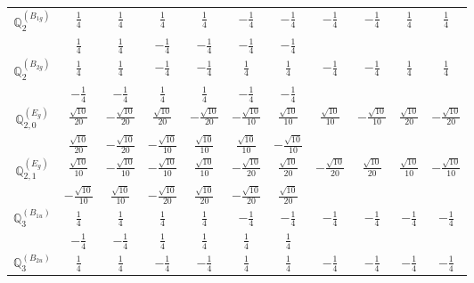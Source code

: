 \documentclass[fleqn,10pt,landscape]{article}
\begin{document}
\begin{itemize}
{\begin{center}
\begin{longtable}{ccccccccccc}
$\mathbb{Q}_{2}^{(B_{1g})}$ & $ \frac{1}{4} $ & $ \frac{1}{4} $ & $ \frac{1}{4} $ & $ \frac{1}{4} $ & $ - \frac{1}{4} $ & $ - \frac{1}{4} $ & $ - \frac{1}{4} $ & $ - \frac{1}{4} $ & $ \frac{1}{4} $ & $ \frac{1}{4} $ \\
& $ \frac{1}{4} $ & $ \frac{1}{4} $ & $ - \frac{1}{4} $ & $ - \frac{1}{4} $ & $ - \frac{1}{4} $ & $ - \frac{1}{4} $ & $  $ & $  $ & $  $ & $  $ \\ \hline
$\mathbb{Q}_{2}^{(B_{2g})}$ & $ \frac{1}{4} $ & $ \frac{1}{4} $ & $ - \frac{1}{4} $ & $ - \frac{1}{4} $ & $ \frac{1}{4} $ & $ \frac{1}{4} $ & $ - \frac{1}{4} $ & $ - \frac{1}{4} $ & $ \frac{1}{4} $ & $ \frac{1}{4} $ \\
& $ - \frac{1}{4} $ & $ - \frac{1}{4} $ & $ \frac{1}{4} $ & $ \frac{1}{4} $ & $ - \frac{1}{4} $ & $ - \frac{1}{4} $ & $  $ & $  $ & $  $ & $  $ \\ \hline
$\mathbb{Q}_{2,0}^{(E_{g})}$ & $ \frac{\sqrt{10}}{20} $ & $ - \frac{\sqrt{10}}{20} $ & $ \frac{\sqrt{10}}{20} $ & $ - \frac{\sqrt{10}}{20} $ & $ - \frac{\sqrt{10}}{10} $ & $ \frac{\sqrt{10}}{10} $ & $ \frac{\sqrt{10}}{10} $ & $ - \frac{\sqrt{10}}{10} $ & $ \frac{\sqrt{10}}{20} $ & $ - \frac{\sqrt{10}}{20} $ \\
& $ \frac{\sqrt{10}}{20} $ & $ - \frac{\sqrt{10}}{20} $ & $ - \frac{\sqrt{10}}{10} $ & $ \frac{\sqrt{10}}{10} $ & $ \frac{\sqrt{10}}{10} $ & $ - \frac{\sqrt{10}}{10} $ & $  $ & $  $ & $  $ & $  $ \\ \hline
$\mathbb{Q}_{2,1}^{(E_{g})}$ & $ \frac{\sqrt{10}}{10} $ & $ - \frac{\sqrt{10}}{10} $ & $ - \frac{\sqrt{10}}{10} $ & $ \frac{\sqrt{10}}{10} $ & $ - \frac{\sqrt{10}}{20} $ & $ \frac{\sqrt{10}}{20} $ & $ - \frac{\sqrt{10}}{20} $ & $ \frac{\sqrt{10}}{20} $ & $ \frac{\sqrt{10}}{10} $ & $ - \frac{\sqrt{10}}{10} $ \\
& $ - \frac{\sqrt{10}}{10} $ & $ \frac{\sqrt{10}}{10} $ & $ - \frac{\sqrt{10}}{20} $ & $ \frac{\sqrt{10}}{20} $ & $ - \frac{\sqrt{10}}{20} $ & $ \frac{\sqrt{10}}{20} $ & $  $ & $  $ & $  $ & $  $ \\ \hline
$\mathbb{Q}_{3}^{(B_{1u})}$ & $ \frac{1}{4} $ & $ \frac{1}{4} $ & $ \frac{1}{4} $ & $ \frac{1}{4} $ & $ - \frac{1}{4} $ & $ - \frac{1}{4} $ & $ - \frac{1}{4} $ & $ - \frac{1}{4} $ & $ - \frac{1}{4} $ & $ - \frac{1}{4} $ \\
& $ - \frac{1}{4} $ & $ - \frac{1}{4} $ & $ \frac{1}{4} $ & $ \frac{1}{4} $ & $ \frac{1}{4} $ & $ \frac{1}{4} $ & $  $ & $  $ & $  $ & $  $ \\ \hline
$\mathbb{Q}_{3}^{(B_{2u})}$ & $ \frac{1}{4} $ & $ \frac{1}{4} $ & $ - \frac{1}{4} $ & $ - \frac{1}{4} $ & $ \frac{1}{4} $ & $ \frac{1}{4} $ & $ - \frac{1}{4} $ & $ - \frac{1}{4} $ & $ - \frac{1}{4} $ & $ - \frac{1}{4} $ \\

\end{longtable}
\end{center}}
\end{itemize}
\end{document}
